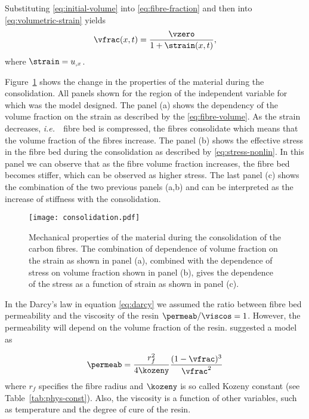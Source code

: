 \documentclass[twoside,a4paper,12pt]{article}
\newcommand{\figref}[1]{Figure~\ref{#1}}
\newcommand{\tabref}[1]{Table~\ref{#1}}
\newcommand{\ie}{{\it i.e.\ }}
\newcommand{\note}[1]{}
\begin{document}
Substituting \eqref{eq:initial-volume} into \eqref{eq:fibre-fraction}
and then into \eqref{eq:volumetric-strain} yields
%
\begin{align}
  \vfrac(x,t) = \frac{\vzero}{1+\strain(x,t)}, \label{eq:fibre-volume}
\end{align}
%
where $\strain =  u_{,x}$.

\figref{fig:consolidation} shows the change in the properties of the material during the consolidation. All panels shown for the region of the independent variable for which was the model designed. The panel (a) shows the dependency of the volume fraction on the strain as described by the \eqref{eq:fibre-volume}. As the strain decreases, \ie\ fibre bed is compressed, the fibres consolidate which means that the volume fraction of the fibres increase. The panel (b) shows the effective stress in the fibre bed during the consolidation as described by \eqref{eq:stress-nonlin}. In this panel we can observe that as the fibre volume fraction increases, the fibre bed becomes stiffer, which can be observed as higher stress. The last panel (c) shows the combination of the two previous panels (a,b) and can be interpreted as the increase of stiffness with the consolidation.
%
\begin{figure}
  \centering
  \texttt{[image: consolidation.pdf]}
  \caption{Mechanical properties of the material during the consolidation of the carbon fibres. The combination of dependence of volume fraction on the strain as shown in panel (a), combined with the dependence of stress on volume fraction shown in panel (b), gives the dependence of the stress as a function of strain as shown in panel (c).}
  \label{fig:consolidation}
\end{figure}

In the Darcy's law in equation \eqref{eq:darcy} we assumed the ratio
between fibre bed permeability and the viscosity of the resin
$\permeab/\viscos=1$. However, the permeability will depend on the volume
fraction of the resin. \citet{Dave1987b} suggested a model as
%
\note{I didn't find the model in their paper, this expression is given in \citet{Hubert1999}}
%
\begin{align}
  \permeab = \frac{r_f^2}{4\kozeny} \frac{(1-\vfrac)^3}{\vfrac^2} \label{eq:permeability}
\end{align}
%
where $r_f$ specifies the fibre radius and $\kozeny$ is so called Kozeny
constant (see \tabref{tab:phys-const}). Also, the viscosity is a
function of other variables, such as temperature and the degree of
cure of the resin.
\end{document}
